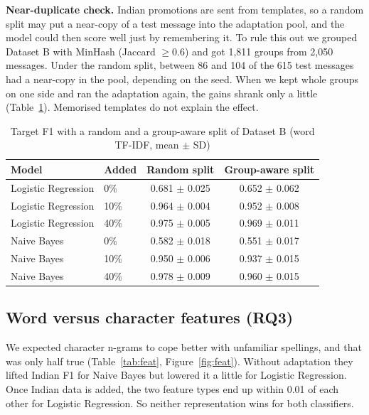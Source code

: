 \textbf{Near-duplicate check.} Indian promotions are sent from templates, so a random split may put a near-copy of a test message into the adaptation pool, and the model could then score well just by remembering it. To rule this out we grouped Dataset B with MinHash (Jaccard $\ge 0.6$) and got 1,811 groups from 2,050 messages. Under the random split, between 86 and 104 of the 615 test messages had a near-copy in the pool, depending on the seed. When we kept whole groups on one side and ran the adaptation again, the gains shrank only a little (Table~\ref{tab:group}). Memorised templates do not explain the effect.

\begin{table}[H]
\centering
\caption{Target F1 with a random and a group-aware split of Dataset B (word TF-IDF, mean $\pm$ SD)}
\label{tab:group}
\begin{tabular}{|l|l|c|c|}
\hline
\textbf{Model} & \textbf{Added} & \textbf{Random split} & \textbf{Group-aware split} \\
\hline
Logistic Regression & 0\% & 0.681 $\pm$ 0.025 & 0.652 $\pm$ 0.062 \\
\hline
Logistic Regression & 10\% & 0.964 $\pm$ 0.004 & 0.952 $\pm$ 0.008 \\
\hline
Logistic Regression & 40\% & 0.975 $\pm$ 0.005 & 0.969 $\pm$ 0.011 \\
\hline
Naive Bayes & 0\% & 0.582 $\pm$ 0.018 & 0.551 $\pm$ 0.017 \\
\hline
Naive Bayes & 10\% & 0.950 $\pm$ 0.006 & 0.937 $\pm$ 0.015 \\
\hline
Naive Bayes & 40\% & 0.978 $\pm$ 0.009 & 0.960 $\pm$ 0.015 \\
\hline
\end{tabular}
\end{table}

\subsection{Word versus character features (RQ3)}
We expected character n-grams to cope better with unfamiliar spellings, and that was only half true (Table~\ref{tab:feat}, Figure~\ref{fig:feat}). Without adaptation they lifted Indian F1 for Naive Bayes but lowered it a little for Logistic Regression. Once Indian data is added, the two feature types end up within 0.01 of each other for Logistic Regression. So neither representation wins for both classifiers.

